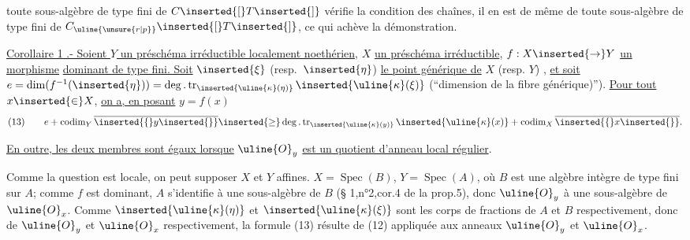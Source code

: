 toute sous-algèbre de type fini de $C\inserted{[}T\inserted{]}$ vérifie la condition des chaînes, il en est de même de toute sous-algèbre de type fini de $C_{\uline{\unsure{r|p}}}\inserted{[}T\inserted{]}$, ce qui achève la démonstration.


\uline{Corollaire 1 .- Soient $Y$ un préschéma irréductible localement noethérien}, $X$ \uline{un préschéma irréductible}, $f:X\inserted{\to}Y$ \uline{un morphisme}  \uline{dominant de type fini. Soit} $\inserted{\xi}$ (resp.\ $\inserted{\eta}$) \uline{le point générique de} $X$ (resp. $Y$) , \uline{et soit} $e=\dim(f^{-1}(\inserted{\eta}))=\deg.\operatorname{tr}_{\inserted{\uline{\kappa}(\eta)}}\inserted{\uline{\kappa}(\xi)}$ (``dimension de la fibre générique)''). \uline{Pour tout} $x\inserted{\in}X$, \uline{on a, en posant} $y=f(x)$
\[
(13)\qquad e+\operatorname{codim}_Y\overline{\inserted{\{}y\inserted{\}}}\inserted{\geq}\deg.\operatorname{tr}_{\inserted{\uline{\kappa}(y)}}\inserted{\uline{\kappa}(x)}+\operatorname{codim}_X\overline{\inserted{\{}x\inserted{\}}}.
\]

\uline{En outre, les deux membres sont égaux lorsque} $\uline{O}_y$ \uline{est un quotient d'anneau local régulier}.

Comme la question est locale, on peut supposer $X$ et $Y$ affines.  $X=\operatorname{Spec}(B)$, $Y=\operatorname{Spec}(A)$, où $B$ est une algèbre intègre de type fini sur $A$; comme $f$ est dominant, $A$ s'identifie à une sous-algèbre de $B$ (§ 1,n°2,cor.4 de la prop.5), donc $\uline{O}_y$ à une sous-algèbre de $\uline{O}_x$. Comme $\inserted{\uline{\kappa}(\eta)}$ et $\inserted{\uline{\kappa}(\xi)}$ sont les corps de fractions de $A$ et $B$ respectivement, donc de  $\uline{O}_y$ et $\uline{O}_x$ respectivement, la formule (13) résulte de (12) appliquée aux anneaux $\uline{O}_y$ et $\uline{O}_x$.

